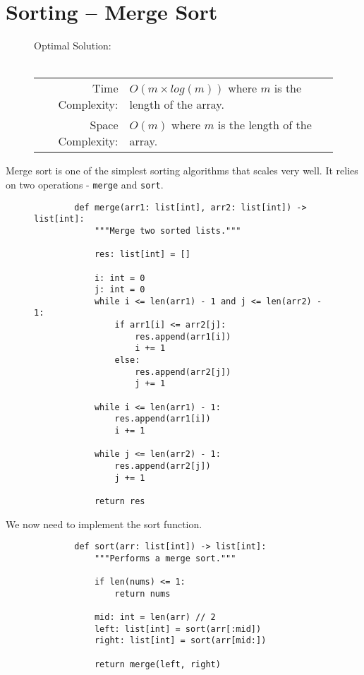 
\section{Sorting -- Merge Sort}

\begin{figure}[H]
    Optimal Solution:\\\\
    \begin{tabular}{rl}
        Time Complexity:& \(O(m \times log(m))\) where \(m\) is the length of
        the array.\\
        Space Complexity:& \(O(m)\) where \(m\) is the length of the array.
    \end{tabular}
\end{figure}

Merge sort is one of the simplest sorting algorithms that scales very well. It
relies on two operations - \texttt{merge} and
\texttt{sort}.

\begin{figure}[H]
    \centering
    \begin{verbatim}
        def merge(arr1: list[int], arr2: list[int]) -> list[int]:
            """Merge two sorted lists."""

            res: list[int] = []

            i: int = 0
            j: int = 0
            while i <= len(arr1) - 1 and j <= len(arr2) - 1:
                if arr1[i] <= arr2[j]:
                    res.append(arr1[i])
                    i += 1
                else:
                    res.append(arr2[j])
                    j += 1
            
            while i <= len(arr1) - 1:
                res.append(arr1[i])
                i += 1

            while j <= len(arr2) - 1:
                res.append(arr2[j])
                j += 1

            return res
    \end{verbatim}
\end{figure}

We now need to implement the sort function.

\begin{figure}[H]
    \centering
    \begin{verbatim}
        def sort(arr: list[int]) -> list[int]:
            """Performs a merge sort."""

            if len(nums) <= 1:
                return nums
            
            mid: int = len(arr) // 2
            left: list[int] = sort(arr[:mid])
            right: list[int] = sort(arr[mid:])

            return merge(left, right)
    \end{verbatim}
\end{figure}

